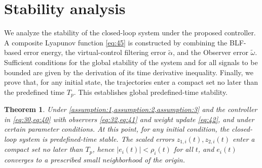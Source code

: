 \documentclass[pdflatex,sn-mathphys-num]{sn-jnl}%
\theoremstyle{thmstyleone}%
\newtheorem{theorem}{Theorem}%
\theoremstyle{thmstyletwo}%
\theoremstyle{thmstylethree}%
\begin{document}
\section{Stability analysis}

 We analyze the stability of the closed-loop system under the proposed controller. A composite Lyapunov function \cref{eq:45} is constructed by combining the BLF-based error energy, the virtual-control filtering error $\tilde\alpha$, and the Observer error $\tilde\omega$.  Sufficient conditions for the global stability of the system and for all signals to be bounded are given by the derivation of its time derivative inequality. Finally, we prove that, for any initial state, the trajectories enter a compact set no later than the predefined time $T_p$. This establishes global predefined-time stability.

 \begin{theorem}
	Under \cref{assumption:1,assumption:2,assumption:3} and the controller in \cref{eq:30,eq:40} with observers \cref{eq:32,eq:41} and weight update \cref{eq:42}, and under certain parameter conditions. At this point, for any initial condition, the closed-loop system is predefined-time stable. The scaled errors $z_{1,i}(t),z_{2,i}(t)$ enter a compact set no later than $T_p$, hence $|e_{i}(t)|<\rho_{i}(t)$ for all $t$, and $e_i(t)$ converges to a prescribed small neighborhood of the origin.
\end{theorem}
\end{document}
